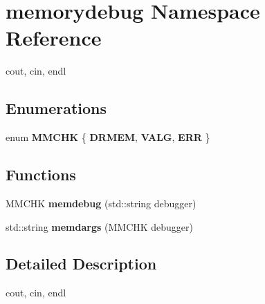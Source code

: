 \hypertarget{namespacememorydebug}{}\section{memorydebug Namespace Reference}
\label{namespacememorydebug}


cout, cin, endl  


\subsection*{Enumerations}
\begin{DoxyCompactItemize}
\item 
\mbox{\label{namespacememorydebug_a83a201aba3c4913d2e0cca3e6f38c44f}} 
enum {\bfseries M\+M\+C\+HK} \{ {\bfseries D\+R\+M\+EM}, 
{\bfseries V\+A\+LG}, 
{\bfseries E\+RR}
 \}
\end{DoxyCompactItemize}
\subsection*{Functions}
\begin{DoxyCompactItemize}
\item 
\mbox{\label{namespacememorydebug_a5cb626e3e90d445e061521a327f67949}} 
M\+M\+C\+HK {\bfseries memdebug} (std\+::string debugger)
\item 
\mbox{\label{namespacememorydebug_af6c6d4e122f8370f01b95be9b15bf8dd}} 
std\+::string {\bfseries memdargs} (M\+M\+C\+HK debugger)
\end{DoxyCompactItemize}


\subsection{Detailed Description}
cout, cin, endl 